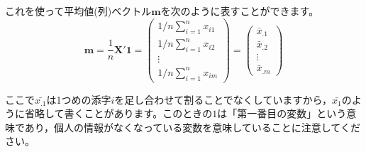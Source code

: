 \documentclass{ltjsbook}
\begin{document}
これを使って平均値(列)ベクトル$\bm{m}$を次のように表すことができます。
\[ \bm{m} = \frac{1}{n} \bm{X}' \bm{1} =
	\begin{pmatrix} 1/n\sum_{i=1}^{n} x_{i1} \\ 1/n\sum_{i=1}^{n} x_{i2} \\ \vdots \\ 1/n\sum_{i=1}^{n} x_{im} \end{pmatrix} =
	\begin{pmatrix}\bar{x}_{.1} \\ \bar{x}_{.2}\\ \vdots \\\bar{x}_{.m} \end{pmatrix} \]

ここで$\bar{x_.1}$は1つめの添字$i$を足し合わせて割ることでなくしていますから，$\bar{x_1}$のように省略して書くことがあります。このときの$1$は「第一番目の変数」という意味であり，個人の情報がなくなっている変数を意味していることに注意してください。
\end{document}
